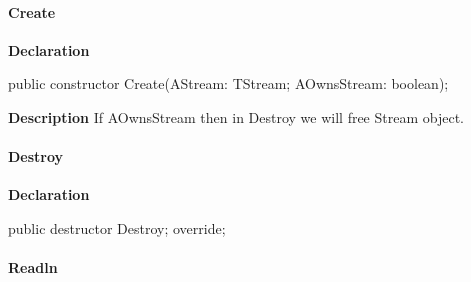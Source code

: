 \documentclass{report}
\newif\ifpdf
\begin{document}
\paragraph*{Create}\hspace*{\fill}

\label{PasDoc_ProcessLineTalk.TTextReader-Create}
\begin{list}{}{
\setlength{\itemindent}{0cm}
\setlength{\listparindent}{0cm}
\setlength{\leftmargin}{\evensidemargin}
\addtolength{\leftmargin}{\tmplength}
\settowidth{\labelsep}{X}
\addtolength{\leftmargin}{\labelsep}
\setlength{\labelwidth}{\tmplength}
}
\item[\textbf{Declaration}\hfill]
\ifpdf
\begin{flushleft}
\fi
\begin{ttfamily}
public constructor Create(AStream: TStream; AOwnsStream: boolean);\end{ttfamily}

\ifpdf
\end{flushleft}
\fi

\par
\item[\textbf{Description}]
If AOwnsStream then in Destroy we will free Stream object.

\end{list}
\paragraph*{Destroy}\hspace*{\fill}

\label{PasDoc_ProcessLineTalk.TTextReader-Destroy}
\begin{list}{}{
\setlength{\itemindent}{0cm}
\setlength{\listparindent}{0cm}
\setlength{\leftmargin}{\evensidemargin}
\addtolength{\leftmargin}{\tmplength}
\settowidth{\labelsep}{X}
\addtolength{\leftmargin}{\labelsep}
\setlength{\labelwidth}{\tmplength}
}
\item[\textbf{Declaration}\hfill]
\ifpdf
\begin{flushleft}
\fi
\begin{ttfamily}
public destructor Destroy; override;\end{ttfamily}

\ifpdf
\end{flushleft}
\fi

\end{list}
\paragraph*{Readln}\hspace*{\fill}
\end{document}
